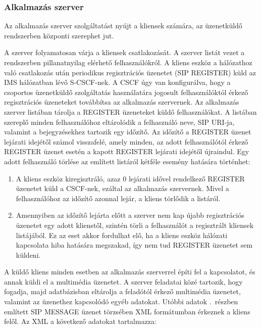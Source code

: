 \subsubsection{Alkalmazás szerver}
\label{sec:appserver}

Az alkalmazás szerver szolgáltatást nyújt a kliensek számára, az üzenetküldő rendszerben központi szerephet jut.

A szerver folyamatosan várja a kliensek csatlakozását. A szerver listát vezet a rendszerben pillanatnyilag elérhető felhasználókról. A kliens eszköz a hálózathoz való csatlakozás után periodikus regisztrációs üzenetet (SIP REGISTER) küld az IMS hálózatban lévő S-CSCF-nek. A CSCF úgy van konfigurálva, hogy a csoportos üzenetküldő szolgáltatás használatára jogosult felhasználóktól érkező regisztrációs üzeneteket továbbítsa az alkalmazás szervernek. Az alkalmazás szerver listában tárolja a REGISTER üzeneteket küldő felhasználókat. A listában szereplő minden felhasználóhoz eltárolódik a felhasználó neve, SIP URI-ja, valamint a bejegyzésekhez tartozik egy időzítő. Az időzítő a REGISTER üzenet lejárati idejétől számol visszafelé, amely minden, az adott felhasználótól érkező REGISTER üzenet esetén a kapott REGISTER lejárati idejétől újraindul. Egy adott felhasználó törlése az említett listáról kétféle esemény hatására történhet:
\begin{enumerate}\itemsep1pt
\item	A kliens eszköz kiregisztráló, azaz 0 lejárati idővel rendelkező REGISTER üzenetet küld a CSCF-nek, ezáltal az alkalmazás szervernek. Mivel a felhasználóhoz az időzítő azonnal lejár, a kliens törlődik a listáról. 
\item Amennyiben az időzítő lejárta előtt a szerver nem kap újabb regisztrációs üzenetet egy adott klienstől, szintén törli a felhasználót a regisztrált kliensek listájából. Ez az eset akkor fordulhat elő, ha a kliens eszköz hálózati kapcsolata hiba hatására megszakad, így nem tud REGISTER üzenetet sem küldeni.
\end{enumerate} 

A küldő kliens minden esetben az alkalmazás szerverrel építi fel a kapcsolatot, és annak küldi el a multimédia üzenetet. A szerver feladatai közé tartozik, hogy fogadja, majd adatbázisban eltárolja a feladótól érkező multimédia üzenetet, valamint az üzenethez kapcsolódó egyéb adatokat. Utóbbi adatok .~részben említett SIP MESSAGE üzenet törzsében XML formátumban érkeznek a kliens felől. Az XML a következő adatokat tartalmazza: 

